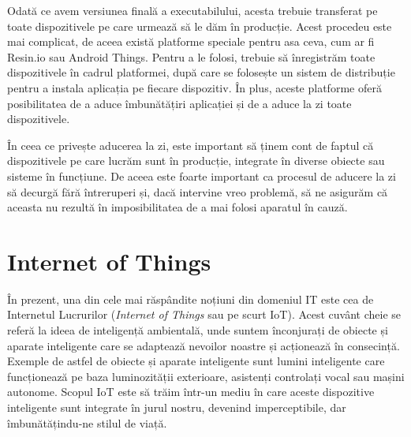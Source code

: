 Odată ce avem versiunea finală a executabilului, acesta trebuie transferat pe
toate dispozitivele pe care urmează să le dăm în producție. Acest procedeu este
mai complicat, de aceea există platforme speciale pentru asa ceva, cum ar fi
Resin.io sau Android Things. Pentru a le folosi, trebuie să înregistrăm toate
dispozitivele în cadrul platformei, după care se folosește un sistem de
distribuție pentru a instala aplicația pe fiecare dispozitiv. În plus, aceste
platforme oferă posibilitatea de a aduce îmbunătățiri aplicației și de a aduce
la zi toate dispozitivele.

În ceea ce privește aducerea la zi, este important să ținem cont de faptul că
dispozitivele pe care lucrăm sunt în producție, integrate în diverse obiecte sau
sisteme în funcțiune. De aceea este foarte important ca procesul de aducere la
zi să decurgă fără întreruperi și, dacă intervine vreo problemă, să ne
asigurăm că aceasta nu rezultă în imposibilitatea de a mai folosi aparatul în
cauză.

\section{Internet of Things}
\label{sec:embed:iot}

În prezent, una din cele mai răspândite noțiuni din domeniul IT este cea de
Internetul Lucrurilor (\textit{Internet of Things} sau pe scurt IoT). Acest cuvânt cheie
se referă la ideea de inteligență ambientală, unde suntem înconjurați de obiecte
și aparate inteligente care se adaptează nevoilor noastre și acționează în
consecință. Exemple de astfel de obiecte și aparate inteligente sunt lumini inteligente care funcționează pe baza luminozității
exterioare, asistenți controlați vocal sau mașini autonome. Scopul IoT
este să trăim într-un mediu în care aceste dispozitive inteligente sunt
integrate în jurul nostru, devenind imperceptibile, dar îmbunătățindu-ne stilul
de viață.

